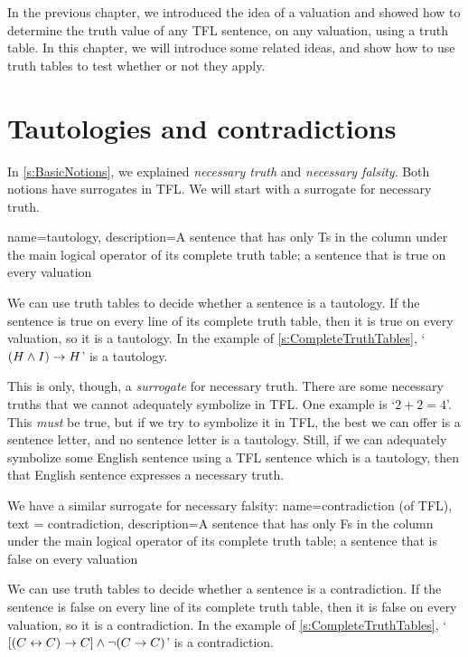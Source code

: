 In the previous chapter, we introduced the idea of a valuation and showed how to determine the truth value of any TFL sentence, on any valuation, using a truth table. In this chapter, we will introduce some related ideas, and show how to use truth tables to test whether or not they apply.


\section{Tautologies and contradictions}
In \cref{s:BasicNotions}, we explained \emph{necessary truth} and \emph{necessary falsity}. Both notions have surrogates in TFL. We will start with a surrogate for necessary truth.

{
name=tautology,
description={A sentence that has only Ts in the column under the main logical operator of its \gls{complete truth table}; a sentence that is true on every \gls{valuation}}
}

We can use truth tables to decide whether a sentence is a tautology. If the sentence is true on every line of its complete truth table, then it is true on every valuation, so it is a tautology. In the example of \cref{s:CompleteTruthTables}, `$(H \wedge I) \rightarrow H$' is a tautology.

This is only, though, a \emph{surrogate} for necessary truth. There are some necessary truths that we cannot adequately symbolize in TFL. One example is `$2 + 2 = 4$'. This \emph{must} be true, but if we try to symbolize it in TFL, the best we can offer is a sentence letter, and no sentence letter is a tautology. Still, if we can adequately symbolize some English sentence using a TFL sentence which is a tautology, then that English sentence expresses a necessary truth.

We have a similar surrogate for necessary falsity:
{
  name=contradiction (of TFL),
  text = contradiction,
description={A sentence that has only Fs in the column under the main logical operator of its \gls{complete truth table}; a sentence that is false on every \gls{valuation}}
}

We can use truth tables to decide whether a sentence is a contradiction. If the sentence is false on every line of its complete truth table, then it is false on every valuation, so it is a contradiction. In the example of \cref{s:CompleteTruthTables}, `$[(C\leftrightarrow C) \rightarrow C] \wedge \neg(C \rightarrow C)$' is a contradiction.

